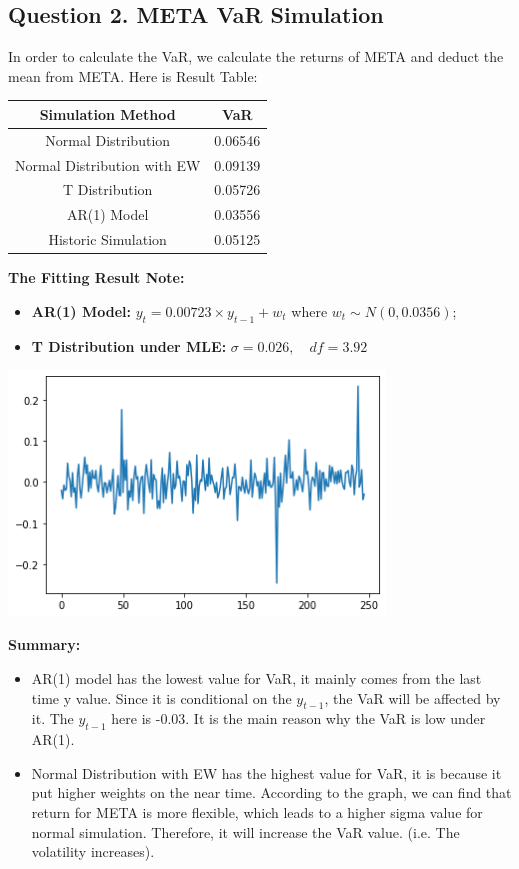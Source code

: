 \documentclass[a4paper,12pt]{article}
\begin{document}
\subsection*{Question 2. META VaR Simulation}
In order to calculate the VaR, we calculate the returns of META and deduct the mean from META. Here is Result Table:\\
\begin{center}
    \begin{tabular}{ c|c}
     \hline
     Simulation Method & VaR\\
     \hline
     Normal Distribution&0.06546\\
     Normal Distribution with EW&0.09139 \\
     T Distribution&0.05726 \\
     AR(1) Model& 0.03556\\
     Historic Simulation& 0.05125\\
     \hline
    \end{tabular}
\end{center}
\textbf{The Fitting Result Note:}
\begin{itemize}
    \item  \textbf{AR(1) Model:} $y_{t} = 0.00723\times y_{t-1} + w_{t}$ where $w_{t} \sim N(0,0.0356)$;
    \item \textbf{T Distribution under MLE:} $\sigma = 0.026,\quad df = 3.92$
\end{itemize}
\begin{center}
    \includegraphics[width=10cm]{output.png}
\end{center}
\textbf{Summary:}
\begin{itemize}
    \item AR(1) model has the lowest value for VaR, it mainly comes from the last time y value. Since it is conditional on the $y_{t-1}$, the VaR will be affected by it. The $y_{t-1}$ here is -0.03. It is the main reason why the VaR is low under AR(1).
    \item Normal Distribution with EW has the highest value for VaR, it is because it put higher weights on the near time. According to the graph, we can find that return for META is more flexible, which leads to a higher sigma value for normal simulation. Therefore, it will increase the VaR value. (i.e. The volatility increases).
\end{itemize}
\newpage
\end{document}
